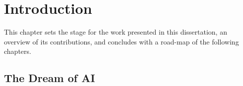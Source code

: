 \chapter{Introduction}

\begin{quote}
\end{quote}


This chapter sets the stage for the work presented in this dissertation, an overview of its contributions, and concludes with a road-map of the following chapters.


\section{The Dream of AI}

